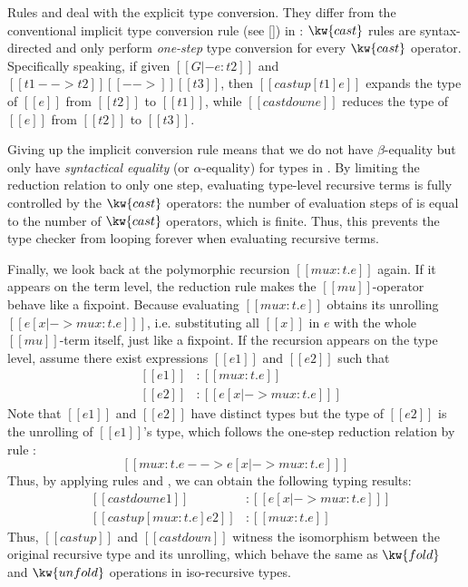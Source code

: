 Rules  and  deal with the explicit type conversion. They differ from the conventional implicit type conversion rule (see \ref{}) in \cc: $\kw{cast}$ rules are syntax-directed and only perform \emph{one-step} type conversion for every $\kw{cast}$ operator. Specifically speaking, if given $[[G |- e : t2]]$ and $[[t1 --> t2]] [[-->]] [[t3]]$, then $[[castup [t1] e]]$ expands the type of $[[e]]$ from $[[t2]]$ to $[[t1]]$, while $[[castdown e]]$ reduces the type of $[[e]]$ from $[[t2]]$ to $[[t3]]$. 

Giving up the implicit conversion rule means that we do not have $\beta$-equality but only have \emph{syntactical equality} (or $\alpha$-equality) for types in \name. By limiting the reduction relation to only one step, evaluating type-level recursive terms is fully controlled by the $\kw{cast}$ operators: the number of evaluation steps of is equal to the number of $\kw{cast}$ operators, which is finite. Thus, this prevents the type checker from looping forever when evaluating recursive terms.

Finally, we look back at the polymorphic recursion $[[mu x:t.e]]$ again. If it appears on the term level, the reduction rule  makes the $[[mu]]$-operator behave like a fixpoint. Because evaluating $[[mu x:t.e]]$ obtains its unrolling $[[e [x |-> mu x:t.e] ]]$, i.e. substituting all $[[x]]$ in $e$ with the whole $[[mu]]$-term itself, just like a fixpoint. If the recursion appears on the type level, assume there exist expressions $[[e1]]$ and $[[e2]]$ such that 
\[\begin{array}{lll}
	&[[e1]] &: [[mu x:t.e]]\\
	&[[e2]] &: [[e [x |-> mu x:t.e] ]]
\end{array}\]
Note that $[[e1]]$ and $[[e2]]$ have distinct types but the type of $[[e2]]$ is the unrolling of $[[e1]]$'s type, which follows the one-step reduction relation by rule :
\[ [[mu x:t.e --> e [x |-> mu x:t.e] ]] \]
 Thus, by applying rules  and , we can obtain the following typing results:
\[\begin{array}{lll}
	&[[castdown e1]] &: [[e [x |-> mu x:t.e] ]]\\
	&[[castup [mu x:t.e] e2]] &: [[mu x:t.e]]
\end{array}\]
Thus, $[[castup]]$ and $[[castdown]]$ witness the isomorphism between the original recursive type and its unrolling, which behave the same as $\kw{fold}$ and $\kw{unfold}$ operations in iso-recursive types.

